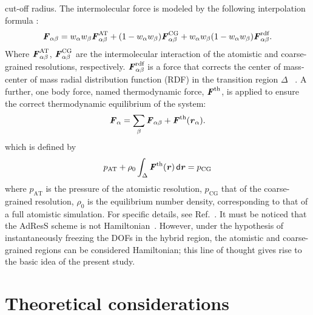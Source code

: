 \documentclass[aip,jcp,a4paper,reprint,onecolumn]{revtex4-1}
\newcommand{\vect}[1]{\textbf{\textit{#1}}}
\newcommand{\dd}[1]{\textsf{#1}}
\newcommand{\AT}{{\textrm{{AT}}}}
\newcommand{\CG}{{\textrm{CG}}}
\newcommand{\rdf}{{\textrm{rdf}}}
\begin{document}
cut-off radius.  The intermolecular force is modeled by the following
interpolation formula \cite{rdfcorr}:
\begin{align}
  \vect F_{\alpha\beta} =
  w_\alpha w_\beta\vect F^{\AT}_{\alpha\beta} +
  (1-w_\alpha w_\beta)\vect F^{\CG}_{\alpha\beta} +
  w_\alpha w_\beta (1-w_\alpha w_\beta)\vect F_{\alpha\beta}^{\rdf}.
\label{grf}
\end{align}
Where $ \vect F^{\AT}_{\alpha\beta}$, $ \vect F^{\CG}_{\alpha\beta}$
are the intermolecular interaction of the atomistic and coarse-grained
resolutions, respectively.  $\vect F_{\alpha\beta}^{\rdf}$ is a force that corrects the center of mass-center of mass radial distribution function (RDF) in the transition region $\Delta$ ~\cite{rdfcorr}. A further, one body force, named thermodynamic force, ${\vect F}^{\textrm{th}}$, is applied to ensure the correct thermodynamic equilibrium of the system:
\begin{equation}
  {\vect F}_{\alpha}=
  \sum_{\beta}{\vect F}_{\alpha\beta}+
  {\vect F}^{\textrm{th}}(\vect r_\alpha).
\label{mody}
\end{equation}
which is defined by
\begin{equation}
  p_{\AT}+
  \rho_0
  \int_{\Delta} {\vect F}^\text{th}(\vect r)\,\dd d\vect r
  =p_{\CG}
  \label{thf}
\end{equation}
where $p_{\AT}$ is the pressure of the atomistic resolution, $p_{\CG}$ that of the coarse-grained resolution, $\rho_{0}$ is the equilibrium number density, corresponding to that of a full atomistic simulation.
For specific details, see Ref.~\cite{prlgc}. It must be noticed that the 
AdResS scheme is not Hamiltonian~\cite{presolo,prlcomm}. However, under the hypothesis of instantaneously
freezing the DOFs in the hybrid region, the atomistic and
coarse-grained regions can be considered Hamiltonian; this line of thought gives rise to the basic
idea of the present study.

\section{Theoretical considerations}
\end{document}
